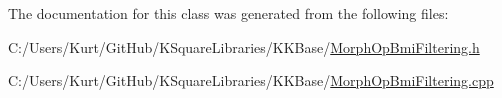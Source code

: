 The documentation for this class was generated from the following files\+:\begin{DoxyCompactItemize}
\item 
C\+:/\+Users/\+Kurt/\+Git\+Hub/\+K\+Square\+Libraries/\+K\+K\+Base/\hyperlink{_morph_op_bmi_filtering_8h}{Morph\+Op\+Bmi\+Filtering.\+h}\item 
C\+:/\+Users/\+Kurt/\+Git\+Hub/\+K\+Square\+Libraries/\+K\+K\+Base/\hyperlink{_morph_op_bmi_filtering_8cpp}{Morph\+Op\+Bmi\+Filtering.\+cpp}\end{DoxyCompactItemize}
